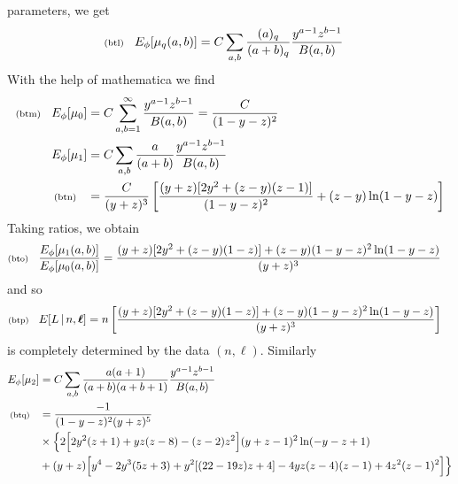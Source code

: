\documentclass[11pt]{article}
\newcommand{\lleq}[1]{\label{#1} }
\renewcommand{\lleq}[1]{\label{#1} {\scriptstyle {\rm (#1)}} \hspace*{2ex} }
\newcommand{\cond}{\,|\,}
\newcommand{\bml}{{\bm{\ell}}}
\begin{document}
parameters, we get
\begin{align}
  \lleq{btl}
  E_\phi[\mu_q(a,b)] &= C\sum_{a,b} \frac{(a)_q}{(a+b)_q}
  \frac{y^{a-1}z^{b-1}}{B(a,b)}
\end{align}
With the help of mathematica we find
\begin{align}
  \lleq{btm}
  E_\phi[\mu_0] &= C\sum_{a,b=1}^\infty \frac{y^{a-1}z^{b-1}}{B(a,b)}
  = \frac{C}{(1 - y - z)^2}
  \\
  E_\phi[\mu_1] &= C\sum_{a,b} \frac{a}{(a+b)}
  \frac{y^{a-1}z^{b-1}}{B(a,b)}
  \nonumber\\
  \lleq{btn}
  &= \frac{C}{(y + z)^3}
  \left[
  \frac{(y + z) [2 y^2 + (z-y)(z-1)]}
  {(1 - y - z)^2 }
   + (z-y) \ln(1 - y - z)
   \right]
\end{align}
Taking ratios, we obtain
\begin{align}
  \lleq{bto}
  \frac{E_\phi[\mu_1(a,b)]} {E_\phi[\mu_0(a,b)]}
  &= \frac{(y + z) [2 y^2 +(z- y) (1 - z)] + (z-y) (1 - y - z)^2 \ln(1 - y - z)}
  {(y + z)^3}
\end{align}
and so
\begin{align}
  \lleq{btp}
  E[L\cond n,\bml] &= n \left[
  \frac{(y + z) [2 y^2 +(z- y) (1 - z)] + (z-y) (1 - y - z)^2 \ln(1 - y - z)}
  {(y + z)^3}\right]
\end{align}
is completely determined by the data $(n,\bml)$.  Similarly
\begin{align}
  E_\phi[\mu_2] &= C\sum_{a,b} \frac{a(a+1)}{(a+b)(a+b+1)}
  \frac{y^{a-1}z^{b-1}}{B(a,b)}
  \nonumber\\
  \lleq{btq} &= \frac{-1}{(1-y-z)^2 (y+z)^5} %
  \nonumber\\
  &\times\Bigl\{ 2 \Bigl[2 y^2(z+1) + yz(z-8) - (z-2) z^2\Bigr]
  (y+z-1)^2 \ln(-y-z+1)
  \nonumber\\
  &+ (y+z) \Bigl[
    y^4 - 2 y^3 (5z+3) + y^2[(22-19 z) z+4] - 4 yz (z-4) (z-1) + 4z^2 (z-1)^2
           \Bigr] \Bigr\}
\end{align}
\end{document}
